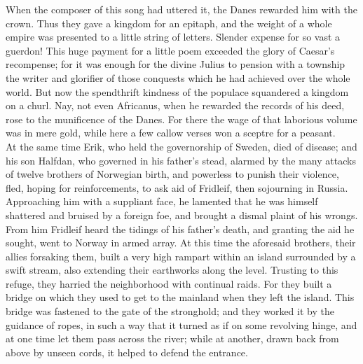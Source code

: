 \documentclass[10pt,a4paper]{report}
\begin{document}
When the composer of this song had uttered it, the Danes rewarded him with the crown. Thus they gave a kingdom for an epitaph, and the weight of a whole empire was presented to a little string of letters. Slender expense for so vast a guerdon! This huge payment for a little poem exceeded the glory of Caesar's recompense; for it was enough for the divine Julius to pension with a township the writer and glorifier of those conquests which he had achieved over the whole world. But now the spendthrift kindness of the populace squandered a kingdom on a churl. Nay, not even Africanus, when he rewarded the records of his deed, rose to the munificence of the Danes. For there the wage of that laborious volume was in mere gold, while here a few callow verses won a sceptre for a peasant.\\

At the same time Erik, who held the governorship of Sweden, died of disease; and his son Halfdan, who governed in his father's stead, alarmed by the many attacks of twelve brothers of Norwegian birth, and powerless to punish their violence, fled, hoping for reinforcements, to ask aid of Fridleif, then sojourning in Russia. Approaching him with a suppliant face, he lamented that he was himself shattered and bruised by a foreign foe, and brought a dismal plaint of his wrongs. From him Fridleif heard the tidings of his father's death, and granting the aid he sought, went to Norway in armed array. At this time the aforesaid brothers, their allies forsaking them, built a very high rampart within an island surrounded by a swift stream, also extending their earthworks along the level. Trusting to this refuge, they harried the neighborhood with continual raids. For they built a bridge on which they used to get to the mainland when they left the island. This bridge was fastened to the gate of the stronghold; and they worked it by the guidance of ropes, in such a way that it turned as if on some revolving hinge, and at one time let them pass across the river; while at another, drawn back from above by unseen cords, it helped to defend the entrance.\\
\end{document}
